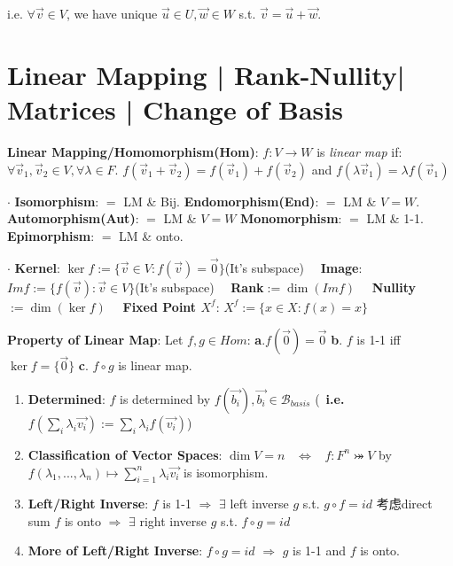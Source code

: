 \documentclass[9pt]{article}
\begin{document}
\quad \quad \quad \quad \quad \quad \quad \quad i.e. $\forall\vec{v}\in V$, we have unique $\vec{u}\in U,\vec{w}\in W$ s.t. $\vec{v}=\vec{u}+\vec{w}$. 


\section{Linear Mapping | Rank-Nullity| Matrices | Change of Basis }

\textbf{Linear Mapping/Homomorphism(Hom)}: {\small $f:V\to W$ is \textit{linear map} if: $\forall \vec{v}_1,\vec{v}_2\in V,\forall \lambda\in F$. $f(\vec{v}_1+\vec{v}_2)=f(\vec{v}_1)+f(\vec{v}_2)$ and $f(\lambda\vec{v}_1)=\lambda f(\vec{v}_1)$}

$\cdot$ {\scriptsize \textbf{Isomorphism}: $=$ LM \& Bij. \quad \textbf{Endomorphism(End)}: $=$ LM \& $V=W$. \quad \textbf{Automorphism(Aut)}: $=$ LM \& $V=W$ \quad \textbf{Monomorphism}: $=$ LM \& 1-1. \quad \textbf{Epimorphism}: $=$ LM \& onto.}

$\cdot$ {\scriptsize \textbf{Kernel}: $\ker f:=\{\vec{v}\in V:f(\vec{v})=\vec{0}\}${\tiny (It's subspace)} \ \ \textbf{Image}: $Im f:=\{f(\vec{v}):\vec{v}\in V\}${\tiny (It's subspace)} \ \ \textbf{Rank}$:=\dim(Im f)$ \ \ \textbf{Nullity}$:=\dim(\ker f)$ \ \ \textbf{Fixed Point $X^f$}: $X^f:=\{x\in X:f(x)=x\}$}

\textbf{Property of Linear Map}: Let $f,g\in Hom$: \quad \textbf{a}.$f(\vec{0})=\vec{0}$ \quad \textbf{b}. $f$ is 1-1 iff $\ker f=\{\vec{0}\}$ \quad \textbf{c}. $f\circ g$ is linear map. \ \

\begin{enumerate}[itemsep=-2pt, topsep=-2pt]
    \item \textbf{Determined}: $f$ is determined by $f(\vec{b_i}),\vec{b_i}\in \mathcal{B}_{basis}$ {\footnotesize (\star \ \textbf{i.e.} $f(\sum_{i}\lambda_i\vec{v_i}):=\sum_{i}\lambda_if(\vec{v_i})$)}
    \item \textbf{Classification of Vector Spaces}: $\dim V=n$ \ $\Leftrightarrow$ \ $f:F^n\bij V$ by $f(\lambda_1,...,\lambda_n)\mapsto\sum_{i=1}^{n}\lambda_i\vec{v_i}$ is isomorphism.
    \item \textbf{Left/Right Inverse}: $f$ is 1-1 $\Rightarrow$ $\exists$ left inverse $g$ s.t. $g\circ f=id$ {\scriptsize 考虑direct sum} \quad \quad $f$ is onto $\Rightarrow$ $\exists$ right inverse $g$ s.t. $f\circ g=id$
    \item \np\textbf{More of Left/Right Inverse}: $f\circ g=id$ $\Rightarrow$ $g$ is 1-1 and $f$ is onto. 
\end{enumerate}
\end{document}
